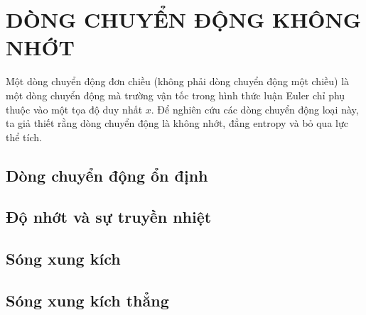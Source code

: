 \documentclass[../../main.tex]{subfiles}
\begin{document}
\chapter{DÒNG CHUYỂN ĐỘNG KHÔNG NHỚT}
    Một dòng chuyển động đơn chiều (không phải dòng chuyển động một chiều) là một dòng chuyển động mà trường vận tốc trong hình thức luận Euler chỉ phụ thuộc vào một tọa độ duy nhất $x$. Để nghiên cứu các dòng chuyển động loại này, ta giả thiết rằng dòng chuyển động là không nhớt, đẳng entropy và bỏ qua lực thể tích.
    \section{Dòng chuyển động ổn định}
		
    \section{Độ nhớt và sự truyền nhiệt}
    
    \section{Sóng xung kích}

    \section{Sóng xung kích thẳng}
\end{document}
